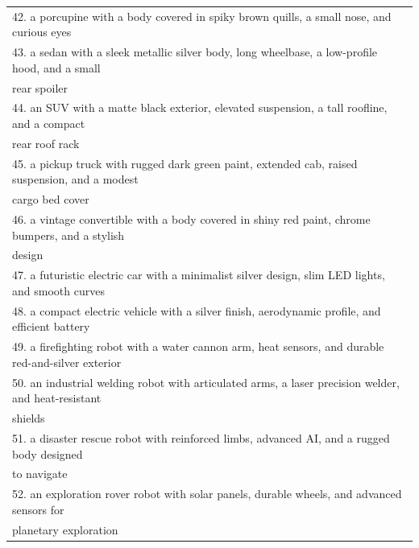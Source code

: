 \begin{table}[!ht]
\begin{threeparttable}
{\begin{tabular}{l}
42. a porcupine with a body covered in spiky brown quills, a small nose, and curious eyes \\
43. a sedan with a sleek metallic silver body, long wheelbase, a low-profile hood, and a small \\ \quad rear spoiler \\
44. an SUV with a matte black exterior, elevated suspension, a tall roofline, and a compact \\ \quad rear roof rack \\
45. a pickup truck with rugged dark green paint, extended cab, raised suspension, and a modest \\ \quad cargo bed cover \\
46. a vintage convertible with a body covered in shiny red paint, chrome bumpers, and a stylish \\ \quad design \\
47. a futuristic electric car with a minimalist silver design, slim LED lights, and smooth curves \\
48. a compact electric vehicle with a silver finish, aerodynamic profile, and efficient battery \\
49. a firefighting robot with a water cannon arm, heat sensors, and durable red-and-silver exterior \\
50. an industrial welding robot with articulated arms, a laser precision welder, and heat-resistant \\ \quad shields \\
51. a disaster rescue robot with reinforced limbs, advanced AI, and a rugged body designed \\ \quad to navigate \\
52. an exploration rover robot with solar panels, durable wheels, and advanced sensors for \\ \quad planetary exploration \\

\bottomrule

\end{tabular}
}

\end{threeparttable}
\end{table}

